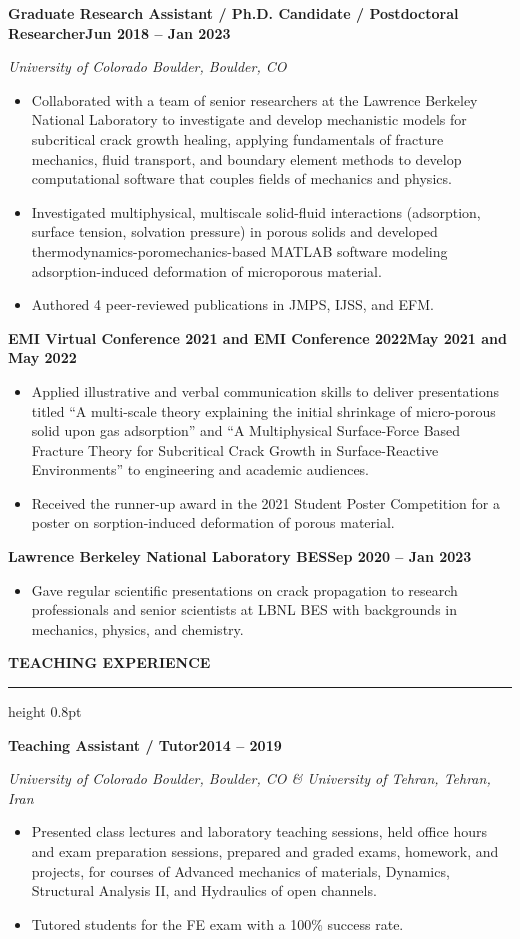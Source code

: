 \documentclass[10pt, letterpaper]{article}
\newcommand{\rsection}[1]{%
  \vspace{8pt}%
  {\large\bfseries\MakeUppercase{#1}}%
  \vspace{1pt}%
  \hrule height 0.8pt%
  \vspace{4pt}%
}
\newcommand{\jobline}[2]{%
  \vspace{5pt}%
  \noindent\textbf{#1}\hfill\textbf{#2}\par%
  \vspace{1pt}%
}
\newcommand{\subline}[1]{%
  \vspace{-1pt}%
  \noindent\textit{#1}\par%
  \vspace{1pt}%
}
\newenvironment{rlist}{%
  \begin{itemize}[leftmargin=1.4em, itemsep=1pt, topsep=2pt, parsep=0pt]%
}{%
  \end{itemize}%
}
\begin{document}
\jobline{Graduate Research Assistant / Ph.D. Candidate / Postdoctoral Researcher}{Jun 2018 -- Jan 2023}
\subline{University of Colorado Boulder, Boulder, CO}
\begin{rlist}
  \item Collaborated with a team of senior researchers at the Lawrence Berkeley National Laboratory to investigate and develop mechanistic models for subcritical crack growth healing, applying fundamentals of fracture mechanics, fluid transport, and boundary element methods to develop computational software that couples fields of mechanics and physics.
  \item Investigated multiphysical, multiscale solid-fluid interactions (adsorption, surface tension, solvation pressure) in porous solids and developed thermodynamics-poromechanics-based MATLAB software modeling adsorption-induced deformation of microporous material.
  \item Authored 4 peer-reviewed publications in JMPS, IJSS, and EFM.
\end{rlist}

\jobline{EMI Virtual Conference 2021 and EMI Conference 2022}{May 2021 and May 2022}
\begin{rlist}
  \item Applied illustrative and verbal communication skills to deliver presentations titled ``A multi-scale theory explaining the initial shrinkage of micro-porous solid upon gas adsorption'' and ``A Multiphysical Surface-Force Based Fracture Theory for Subcritical Crack Growth in Surface-Reactive Environments'' to engineering and academic audiences.
  \item Received the runner-up award in the 2021 Student Poster Competition for a poster on sorption-induced deformation of porous material.
\end{rlist}

\jobline{Lawrence Berkeley National Laboratory BES}{Sep 2020 -- Jan 2023}
\begin{rlist}
  \item Gave regular scientific presentations on crack propagation to research professionals and senior scientists at LBNL BES with backgrounds in mechanics, physics, and chemistry.
\end{rlist}

\rsection{Teaching Experience}

\jobline{Teaching Assistant / Tutor}{2014 -- 2019}
\subline{University of Colorado Boulder, Boulder, CO \& University of Tehran, Tehran, Iran}
\begin{rlist}
  \item Presented class lectures and laboratory teaching sessions, held office hours and exam preparation sessions, prepared and graded exams, homework, and projects, for courses of Advanced mechanics of materials, Dynamics, Structural Analysis II, and Hydraulics of open channels.
  \item Tutored students for the FE exam with a 100\% success rate.
\end{rlist}
\end{document}
